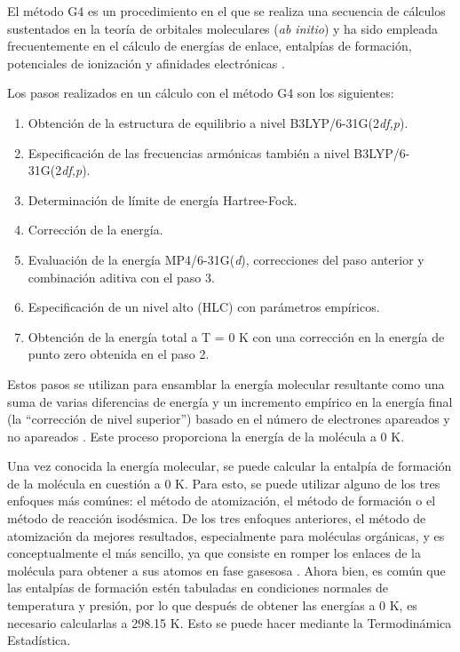 \documentclass[12pt]{article}
\begin{document}
El método G4 es un procedimiento en el que se realiza una secuencia de cálculos sustentados
en la teoría de orbitales moleculares  (\textit{ab initio}) y ha sido empleada frecuentemente
en el cálculo de energías de enlace, entalpías de formación, potenciales de ionización
y afinidades electrónicas  \cite{Cuevas2003, Tajti2004}.

Los pasos realizados en un cálculo con el método G4 son los siguientes:
\begin{enumerate}
        \item Obtención de la estructura de equilibrio a nivel B3LYP/6-31G(2\textit{df,p}).
        \item Especificación de las frecuencias armónicas también a nivel B3LYP/6-31G(2\textit{df,p}).
        \item Determinación de límite de energía Hartree-Fock.
        \item Corrección de la energía.
        \item Evaluación de la energía MP4/6-31G(\textit{d}), correcciones del paso anterior y combinación aditiva con el paso 3.
        \item Especificación de un nivel alto (HLC) con parámetros empíricos.
        \item Obtención de la energía total a T = 0 K con una corrección en la energía de punto zero obtenida en el paso 2.
\end{enumerate}

Estos pasos se utilizan para ensamblar la energía molecular resultante como una suma de varias diferencias de energía y un incremento empírico en la energía final (la ``corrección de nivel superior'') basado en el número de electrones apareados y no apareados  \cite{Curtiss2007}. Este proceso proporciona la energía de la molécula a 0 K.

Una vez conocida la energía molecular, se puede calcular la entalpía de formación de la molécula
en cuestión a 0 K. Para esto, se puede utilizar alguno de los tres enfoques más comúnes:
el método de atomización, el método de formación o  el método de reacción isodésmica.
De los tres enfoques anteriores, el método de atomización da mejores resultados, especialmente
para moléculas orgánicas, y es conceptualmente el más sencillo, ya que consiste en romper
los enlaces de la molécula para obtener a sus atomos en fase gasesosa  \cite{Nicolaides1996}. Ahora bien, es común que las entalpías de formación estén tabuladas en condiciones normales de
temperatura y presión, por lo que después de obtener las energías a 0 K, es necesario calcularlas
a 298.15 K. Esto se puede hacer mediante la Termodinámica Estadística.
\end{document}
